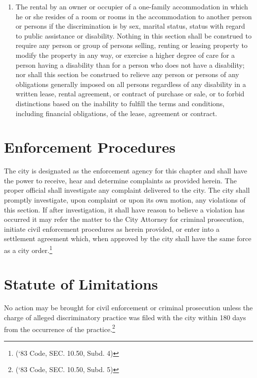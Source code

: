 \begin{enumerate}[{\indent}A)]
\begin{enumerate}
        \item The rental by an owner or occupier of a one-family accommodation in which he or she resides of a room or rooms in the accommodation to another person or persons if the discrimination is by sex, marital status, status with regard to public assistance or disability. Nothing in this section shall be construed to require any person or group of persons selling, renting or leasing property to modify the property in any way, or exercise a higher degree of care for a person having a disability than for a person who does not have a disability; nor shall this section be construed to relieve any person or persons of any obligations generally imposed on all persons regardless of any disability in a written lease, rental agreement, or contract of purchase or sale, or to forbid distinctions based on the inability to fulfill the terms and conditions, including financial obligations, of the lease, agreement or contract.
    \end{enumerate}
\end{enumerate}

\section{Enforcement Procedures}
The city is designated as the enforcement agency for this chapter and shall have the power to receive, hear and determine complaints as provided herein. The proper official shall investigate any complaint delivered to the city. The city shall promptly investigate, upon complaint or upon its own motion, any violations of this section.  If after investigation, it shall have reason to believe a violation has occurred it may refer the matter to the City Attorney for criminal prosecution, initiate civil enforcement procedures as herein provided, or enter into a settlement agreement which, when approved by the city shall have the same force as a city order.\footnote{(‘83 Code, SEC. 10.50, Subd. 4)}

\section{Statute of Limitations}
No action may be brought for civil enforcement or criminal prosecution unless the charge of alleged discriminatory practice was filed with the city within 180 days from the occurrence of the practice.\footnote{(‘83 Code, SEC. 10.50, Subd. 5)}

